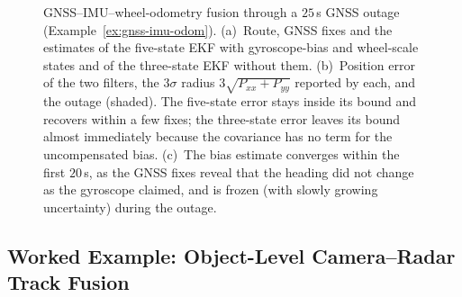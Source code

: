 \documentclass[graybox,envcountchap]{style/SNmono}
\begin{document}
\begin{figure}[!t]
{
}
\caption{GNSS--IMU--wheel-odometry fusion through a $25$\,s GNSS outage (Example~\ref{ex:gnss-imu-odom}). (a)~Route, GNSS fixes and the estimates of the five-state EKF with gyroscope-bias and wheel-scale states and of the three-state EKF without them. (b)~Position error of the two filters, the $3\sigma$ radius $3\sqrt{P_{xx}+P_{yy}}$ reported by each, and the outage (shaded). The five-state error stays inside its bound and recovers within a few fixes; the three-state error leaves its bound almost immediately because the covariance has no term for the uncompensated bias. (c)~The bias estimate converges within the first $20$\,s, as the GNSS fixes reveal that the heading did not change as the gyroscope claimed, and is frozen (with slowly growing uncertainty) during the outage.}
\label{fig:gnss-imu-odom}
\end{figure}

\subsection{Worked Example: Object-Level Camera--Radar Track Fusion}
\label{subsec:ex-camradar}
\end{document}
